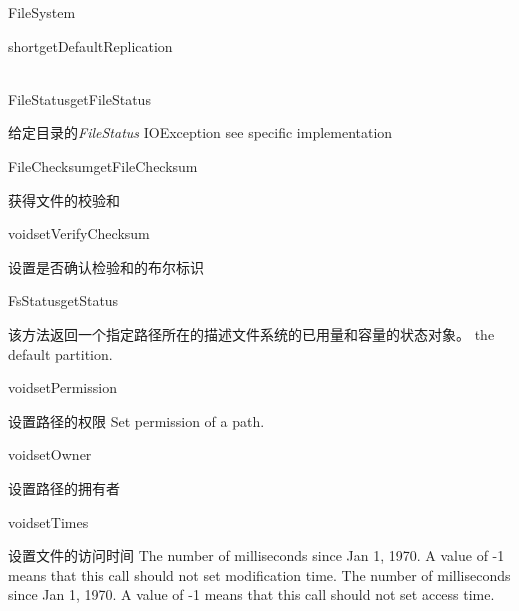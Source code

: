 \begin{XeClass}{FileSystem}
\begin{XeMethod}{\XePublic}{short}{getDefaultReplication}
    \end{XeMethod}

    \begin{XeMethod}{\XePublic \\ \XeAbstract}{FileStatus}{getFileStatus}
         
 给定目录的\emph{FileStatus}
 IOException see specific implementation

    \end{XeMethod}

    \begin{XeMethod}{\XePublic}{FileChecksum}{getFileChecksum}
         
 获得文件的校验和

    \end{XeMethod}

    \begin{XeMethod}{\XePublic}{void}{setVerifyChecksum}
         
 设置是否确认检验和的布尔标识

    \end{XeMethod}

    \begin{XeMethod}{\XePublic}{FsStatus}{getStatus}
         
 该方法返回一个指定路径所在的描述文件系统的已用量和容量的状态对象。
 the default partition.

    \end{XeMethod}

    \begin{XeMethod}{\XePublic}{void}{setPermission}
         
 设置路径的权限
 Set permission of a path.

    \end{XeMethod}

    \begin{XeMethod}{\XePublic}{void}{setOwner}
         
 设置路径的拥有者

    \end{XeMethod}

    \begin{XeMethod}{\XePublic}{void}{setTimes}
         
 设置文件的访问时间
 The number of milliseconds since Jan 1, 1970.
 A value of -1 means that this call should not set modification time.
 The number of milliseconds since Jan 1, 1970.
 A value of -1 means that this call should not set access time.

    \end{XeMethod}


\end{XeClass}
